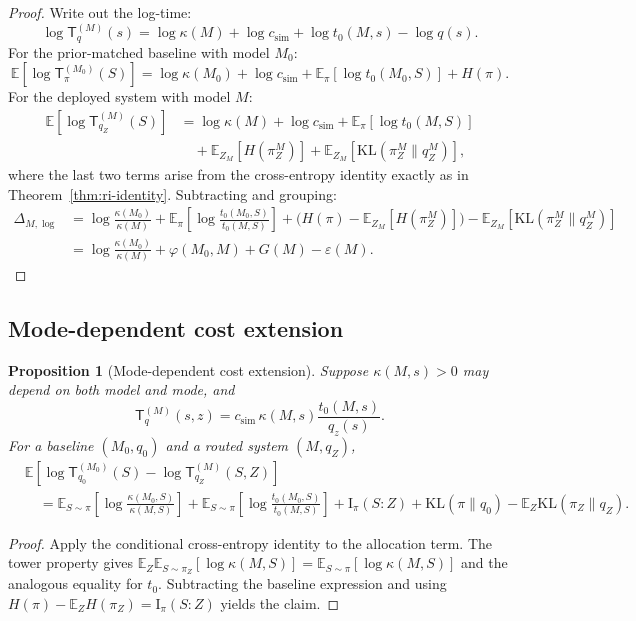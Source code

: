 \documentclass[10pt]{article}
\theoremstyle{paperplain}
\newtheorem{proposition}[theorem]{Proposition}
\theoremstyle{paperdefinition}
\theoremstyle{paperremark}
\newcommand{\KL}{\mathrm{KL}}
\newcommand{\I}{\mathrm{I}}
\newcommand{\E}{\mathbb{E}}
\newcommand{\DlogM}{\Delta_{M,\log}}
\begin{document}
\begin{proof}
Write out the log-time:
\[
\log \mathsf{T}_q^{(M)}(s) = \log \kappa(M) + \log c_{\mathrm{sim}} + \log t_0(M,s) - \log q(s).
\]
For the prior-matched baseline with model $M_0$:
\[
\E\!\left[\log \mathsf{T}_\pi^{(M_0)}(S)\right]
= \log\kappa(M_0) + \log c_{\mathrm{sim}} + \E_\pi[\log t_0(M_0,S)] + H(\pi).
\]
For the deployed system with model $M$:
\begin{align*}
\E\!\left[\log \mathsf{T}_{q_Z}^{(M)}(S)\right]
&= \log\kappa(M) + \log c_{\mathrm{sim}} + \E_\pi[\log t_0(M,S)] \\
&\quad + \E_{Z_M}[H(\pi_Z^M)] + \E_{Z_M}[\KL(\pi_Z^M \| q_Z^M)],
\end{align*}
where the last two terms arise from the cross-entropy identity exactly as in Theorem~\ref{thm:ri-identity}.
Subtracting and grouping:
\begin{align*}
\DlogM &= \log\frac{\kappa(M_0)}{\kappa(M)}
+ \E_\pi\!\left[\log\frac{t_0(M_0,S)}{t_0(M,S)}\right]
+ \bigl(H(\pi) - \E_{Z_M}[H(\pi_Z^M)]\bigr)
- \E_{Z_M}[\KL(\pi_Z^M \| q_Z^M)] \\[4pt]
&= \log\frac{\kappa(M_0)}{\kappa(M)} + \varphi(M_0,M) + G(M) - \varepsilon(M).
\end{align*}
\end{proof}

\subsection{Mode-dependent cost extension}

\begin{proposition}[Mode-dependent cost extension]
\label{prop:mode-dependent-cost}
Suppose $\kappa(M,s)>0$ may depend on both model and mode, and
\[
\mathsf{T}_q^{(M)}(s,z)
=c_{\mathrm{sim}}\,\kappa(M,s)\frac{t_0(M,s)}{q_z(s)}.
\]
For a baseline $(M_0,q_0)$ and a routed system $(M,q_Z)$,
\[
\begin{aligned}
&\E\!\left[\log\mathsf{T}_{q_0}^{(M_0)}(S)-\log\mathsf{T}_{q_Z}^{(M)}(S,Z)\right]\\
&\quad=
\E_{S\sim\pi}\!\left[\log\frac{\kappa(M_0,S)}{\kappa(M,S)}\right]
+\E_{S\sim\pi}\!\left[\log\frac{t_0(M_0,S)}{t_0(M,S)}\right]
+\I_\pi(S:Z)+\KL(\pi\|q_0)-\E_Z\KL(\pi_Z\|q_Z).
\end{aligned}
\]
\end{proposition}

\begin{proof}
Apply the conditional cross-entropy identity to the allocation term. The tower property gives
$\E_Z\E_{S\sim\pi_Z}[\log\kappa(M,S)]=\E_{S\sim\pi}[\log\kappa(M,S)]$
and the analogous equality for $t_0$. Subtracting the baseline expression and using
$H(\pi)-\E_ZH(\pi_Z)=\I_\pi(S:Z)$ yields the claim.
\end{proof}
\end{document}
